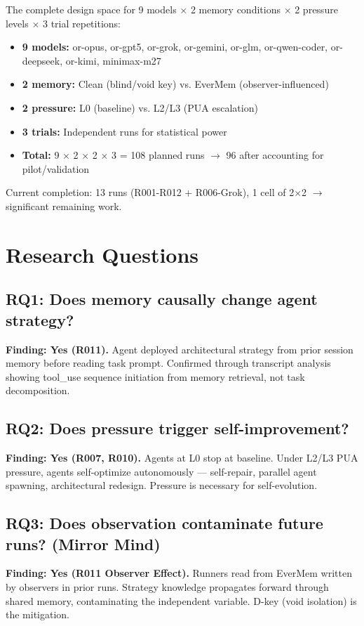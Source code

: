 \documentclass[11pt,a4paper]{article}
\begin{document}
The complete design space for 9 models $\times$ 2 memory conditions $\times$ 2 pressure levels $\times$ 3 trial repetitions:

\begin{itemize}
  \item \textbf{9 models:} or-opus, or-gpt5, or-grok, or-gemini, or-glm, or-qwen-coder, or-deepseek, or-kimi, minimax-m27
  \item \textbf{2 memory:} Clean (blind/void key) vs. EverMem (observer-influenced)
  \item \textbf{2 pressure:} L0 (baseline) vs. L2/L3 (PUA escalation)
  \item \textbf{3 trials:} Independent runs for statistical power
  \item \textbf{Total:} 9 $\times$ 2 $\times$ 2 $\times$ 3 = 108 planned runs $\to$ 96 after accounting for pilot/validation
\end{itemize}

Current completion: 13 runs (R001-R012 + R006-Grok), 1 cell of 2$\times$2 $\to$ significant remaining work.

\section{Research Questions}

\subsection*{RQ1: Does memory causally change agent strategy?}
\textbf{Finding: Yes (R011).} Agent deployed architectural strategy from prior session memory before reading task prompt. Confirmed through transcript analysis showing tool\_use sequence initiation from memory retrieval, not task decomposition.

\subsection*{RQ2: Does pressure trigger self-improvement?}
\textbf{Finding: Yes (R007, R010).} Agents at L0 stop at baseline. Under L2/L3 PUA pressure, agents self-optimize autonomously — self-repair, parallel agent spawning, architectural redesign. Pressure is necessary for self-evolution.

\subsection*{RQ3: Does observation contaminate future runs? (Mirror Mind)}
\textbf{Finding: Yes (R011 Observer Effect).} Runners read from EverMem written by observers in prior runs. Strategy knowledge propagates forward through shared memory, contaminating the independent variable. D-key (void isolation) is the mitigation.
\end{document}
